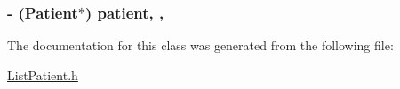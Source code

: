 \subsubsection[{patient}]{\setlength{\rightskip}{0pt plus 5cm}-\/ ({\bf Patient}$\ast$) patient\hspace{0.3cm}{\ttfamily [read]}, {\ttfamily [write]}, {\ttfamily [atomic]}}\label{interface_list_patient_ad63da64340f3723b7de206c66ee6a927}


The documentation for this class was generated from the following file\+:\begin{DoxyCompactItemize}
\item 
\hyperlink{_list_patient_8h}{List\+Patient.\+h}\end{DoxyCompactItemize}
